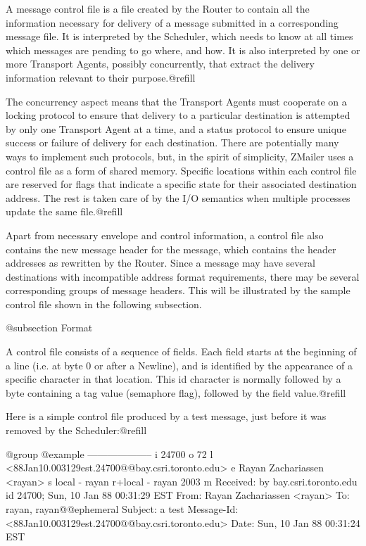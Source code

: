 {{A message control file is a file created by the Router to contain all the
information necessary for delivery of a message submitted in a corresponding
message file.  It is interpreted by the Scheduler, which needs to know at all
times which messages are pending to go where, and how.  It is also
interpreted by one or more Transport Agents, possibly concurrently, that
extract the delivery information relevant to their purpose.@refill

The concurrency aspect means that the Transport Agents must cooperate on a
locking protocol to ensure that delivery to a particular destination is
attempted by only one Transport Agent at a time, and a status protocol to
ensure unique success or failure of delivery for each destination.  There are
potentially many ways to implement such protocols, but, in the spirit of
simplicity, ZMailer uses a control file as a form of shared memory.
Specific locations within each control file are reserved for flags that
indicate a specific state for their associated destination address.
The rest is taken care of by the I/O semantics when multiple processes
update the same file.@refill

Apart from necessary envelope and control information, a control file also
contains the new message header for the message, which contains the header
addresses as rewritten by the Router.  Since a message may have several
destinations with incompatible address format requirements, there may be
several corresponding groups of message headers.  This will be illustrated
by the sample control file shown in the following subsection.

@subsection Format

A control file consists of a sequence of fields.  Each field starts at the
beginning of a line (i.e. at byte 0 or after a Newline), and is identified by
the appearance of a specific character in that location.  This id character
is normally followed by a byte containing a tag value (semaphore flag),
followed by the field value.@refill

Here is a simple control file produced by a test message, just before it was
removed by the Scheduler:@refill

@group
@example
--------------------
i 24700
o 72
l <88Jan10.003129est.24700@@bay.csri.toronto.edu>
e Rayan Zachariassen <rayan>
s local - rayan
r+local - rayan 2003
m
Received: by bay.csri.toronto.edu id 24700; Sun, 10 Jan 88 00:31:29 EST
From:   Rayan Zachariassen <rayan>
To:     rayan, rayan@@ephemeral
Subject: a test
Message-Id: <88Jan10.003129est.24700@@bay.csri.toronto.edu>
Date:   Sun, 10 Jan 88 00:31:24 EST

}}
